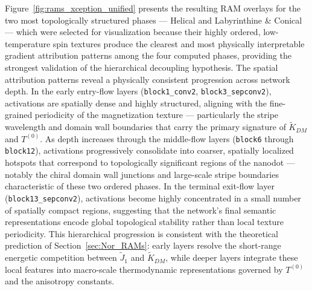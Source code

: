 \documentclass[final,5p,times,twocolumn]{elsarticle}
\begin{document}
Figure~\ref{fig:rams_xception_unified} presents the
resulting RAM overlays for the two most topologically
structured phases --- Helical and Labyrinthine \& Conical
--- which were selected for visualization because their
highly ordered, low-temperature spin textures produce the
clearest and most physically interpretable gradient
attribution patterns among the four computed phases,
providing the strongest validation of the hierarchical
decoupling hypothesis. The spatial attribution patterns
reveal a physically consistent progression across network
depth. In the early entry-flow layers
(\texttt{block1\_conv2}, \texttt{block3\_sepconv2}),
activations are spatially dense and highly structured,
aligning with the fine-grained periodicity of the
magnetization texture --- particularly the stripe wavelength
and domain wall boundaries that carry the primary signature
of $\tilde{K}_{DM}$ and $T^{(0)}$. As depth increases
through the middle-flow layers (\texttt{block6} through
\texttt{block12}), activations progressively consolidate
into coarser, spatially localized hotspots that correspond
to topologically significant regions of the nanodot ---
notably the chiral domain wall junctions and large-scale
stripe boundaries characteristic of these two ordered
phases. In the terminal exit-flow layer
(\texttt{block13\_sepconv2}), activations become highly
concentrated in a small number of spatially compact regions,
suggesting that the network's final semantic representations
encode global topological stability rather than local
texture periodicity. This hierarchical progression is
consistent with the theoretical prediction of
Section~\ref{sec:Nor_RAMs}: early layers resolve the
short-range energetic competition between $\tilde{J}_1$
and $\tilde{K}_{DM}$, while deeper layers integrate these
local features into macro-scale thermodynamic
representations governed by $T^{(0)}$ and the
anisotropy constants.
\end{document}
